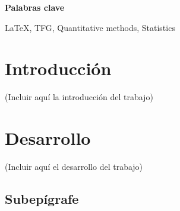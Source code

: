 \documentclass[12pt,a4paper]{report}
\numberwithin{figure}{section} %
\numberwithin{table}{section} %
\begin{document}
\vspace{12pt}

{\fontsize{16}{19.2}\selectfont \textbf{Palabras clave}}

\vspace{12pt}

\LaTeX, TFG, Quantitative methods, Statistics


\newpage  


\section{Introducción}

\vspace{12pt}

(Incluir aquí la introducción del trabajo)

\vspace{12pt}

\section{Desarrollo}  

\vspace{12pt}

(Incluir aquí el desarrollo del trabajo)


\vspace{12pt}

\subsection*{Subepígrafe} 
\end{document}
